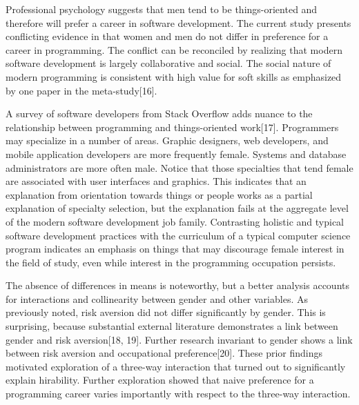 \documentclass[review]{elsarticle}
\begin{document}
Professional psychology suggests that men tend to be things-oriented and therefore will prefer a career in software development.
The current study presents conflicting evidence in that women and men do not differ in preference for a career in programming.
The conflict can be reconciled by realizing that modern software development is largely collaborative and social.
The social nature of modern programming is consistent with high value for soft skills as emphasized by one paper in the meta-study[16].

A survey of software developers from Stack Overflow adds nuance to the relationship between programming and things-oriented work[17].
Programmers may specialize in a number of areas.
Graphic designers, web developers, and mobile application developers are more frequently female.
Systems and database administrators are more often male.
Notice that those specialties that tend female are associated with user interfaces and graphics.
This indicates that an explanation from orientation towards things or people works as a partial explanation of specialty selection,
but the explanation fails at the aggregate level of the modern software development job family.
Contrasting holistic and typical software development practices with the curriculum of a typical computer science program
indicates an emphasis on things that may discourage female interest in the field of study,
even while interest in the programming occupation persists.

The absence of differences in means is noteworthy,
but a better analysis accounts for interactions and collinearity between gender and other variables.
As previously noted, risk aversion did not differ significantly by gender.
This is surprising, because substantial external literature demonstrates a link between gender and risk aversion[18, 19].
Further research invariant to gender shows a link between risk aversion and occupational preference[20].
These prior findings motivated exploration of a three-way interaction that turned out to significantly explain hirability.
Further exploration showed that naive preference for a programming career varies importantly with respect to the three-way interaction.
\end{document}
